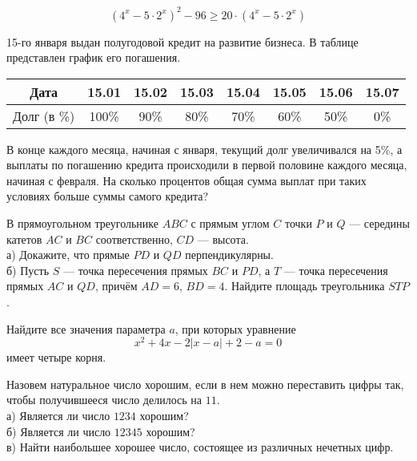\begin{training}[3]
\begin{listofex}
		\[ (4^x-5\cdot2^x)^2-96\ge20\cdot(4^x-5\cdot2^x) \]
		\item 15-го января выдан полугодовой кредит на развитие бизнеса. В таблице
		представлен график его погашения.
		\begin{center}
			\begin{tabular}{|c|c|c|c|c|c|c|c|}
				\hline
				Дата & 15.01 & 15.02 & 15.03 & 15.04 & 15.05 & 15.06 & 15.07 \\
				\hline
				Долг (в \%) & 100\% & 90\% & 80\% & 70\% & 60\% & 50\% & 0\% \\
				\hline
			\end{tabular}
		\end{center}
		В конце каждого месяца, начиная с января, текущий долг увеличивался
		на 5\%, а выплаты по погашению кредита происходили в первой половине
		каждого месяца, начиная с февраля. На сколько процентов общая сумма
		выплат при таких условиях больше суммы самого кредита?
		\item В прямоугольном треугольнике \( ABC \) с прямым углом \( C \)
		точки \( P \) и \( Q \) --- середины катетов \( AC \) и \( BC \) соответственно, \( CD \) --- высота.\\
		а) Докажите, что прямые \( PD \) и \( QD \) перпендикулярны.\\
		б) Пусть \( S \) --- точка пересечения прямых \( BC \) и \( PD \),
		а \( T \) --- точка пересечения прямых \( AC \) и \( QD \),
		причём \( AD = 6 \), \( BD = 4 \).
		Найдите площадь треугольника \( STP \).
		\item Найдите все значения параметра \( a \), при которых уравнение
		\[ x^2+4x-2|x-a|+2-a=0 \]
		имеет четыре корня.
		\item Назовем натуральное число хорошим, если в нем можно переставить
		цифры так, чтобы получившееся число делилось на \( 11 \).\\
		а) Является ли число \( 1234 \) хорошим?\\
		б) Является ли число \( 12345 \) хорошим?\\
		в) Найти наибольшее хорошее число, состоящее из различных нечетных цифр.
	\end{listofex}
\end{training}
